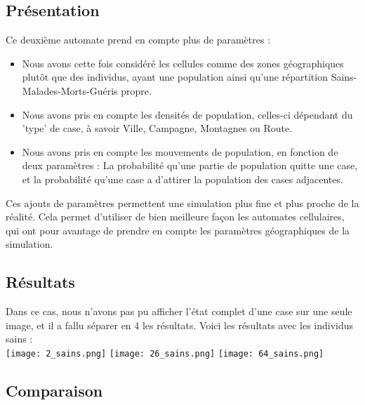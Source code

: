 \documentclass{article}
\begin{document}
\subsection{Présentation}
	Ce deuxième automate prend en compte plus de paramètres : 
	\begin{itemize}
	\item Nous avons cette fois considéré les cellules comme des zones géographiques plutôt que des individus, ayant une population ainsi qu'une répartition Sains-Malades-Morts-Guéris propre.
	\item Nous avons pris en compte les densités de population, celles-ci dépendant du 'type' de case, à savoir Ville, Campagne, Montagnes ou Route.
	\item Nous avons pris en compte les mouvements de population, en fonction de deux paramètres : La probabilité qu'une partie de population quitte une case, et la probabilité qu'une case a d'attirer la population des cases adjacentes.
	\end{itemize}
	
	Ces ajouts de paramètres permettent une simulation plus fine et plus proche de la réalité. Cela permet d'utiliser de bien meilleure façon les automates cellulaires, qui ont pour avantage de prendre en compte les paramètres géographiques de la simulation.


\subsection{Résultats}

Dans ce cas, nous n'avons pas pu afficher l'état complet d'une case sur une seule image, et il a fallu séparer en 4 les résultats. Voici les résultats avec les individus sains : \\[0.6cm]
\texttt{[image: 2\_sains.png]} 
\texttt{[image: 26\_sains.png]} 
\texttt{[image: 64\_sains.png]} 


\subsection{Comparaison}
\end{document}
